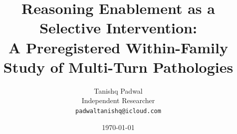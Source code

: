 \documentclass[11pt]{article}
\title{Reasoning Enablement as a Selective Intervention:\\
A Preregistered Within-Family Study of Multi-Turn Pathologies}
\author{Tanishq Padwal\\
\small Independent Researcher\\
\small \texttt{padwaltanishq@icloud.com}}
\date{\today}
\makeatletter
\renewenvironment{abstract}{%
  \begin{center}{\bfseries\large\abstractname\vspace{-.5em}\vspace{\z@}}\end{center}%
  \par\noindent\ignorespaces%
}{%
  \par\bigskip%
}
\makeatother
\begin{document}
\maketitle

\begin{abstract}

\end{abstract}














\end{document}
